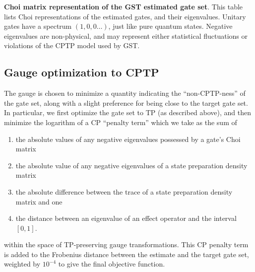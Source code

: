 {\begin{table}[h]
\begin{center}
\caption{\textbf{Choi matrix representation of the GST estimated gate set}.  This table lists Choi representations of the estimated gates, and their eigenvalues.  Unitary gates have a spectrum $(1,0,0\ldots)$, just like pure quantum states.  Negative eigenvalues are non-physical, and may represent either statistical fluctuations or violations of the CPTP model used by GST.\label{bestTPGatesetChoiTable}}
\end{center}
\end{table}

\clearpage

\subsection{Gauge optimization to CPTP}
The gauge is chosen to minimize a quantity indicating the ``non-CPTP-ness'' of the gate set, along with a slight preference for being close to the target gate set.  In particular, we first optimize the gate set to TP (as described above), and then minimize the logarithm of a CP ``penalty term'' which we take as the sum of
\begin{enumerate}
\item the absolute values of any negative eigenvalues possessed by a gate's Choi matrix
\item the absolute value of any negative eigenvalues of a state preparation density matrix
\item the absolute difference between the trace of a state preparation density matrix and one
\item the distance between an eigenvalue of an effect operator and the interval $[0,1]$.
\end{enumerate}
within the space of TP-preserving gauge transformations.  This CP penalty term is added to the Frobenius distance between the estimate and the target gate set, weighted by $10^{-4}$ to give the final objective function.

}
